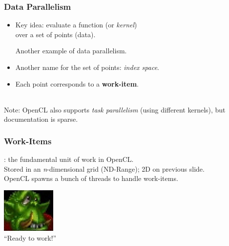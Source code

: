 \begin{frame}
  \frametitle{Data Parallelism}


  \begin{itemize}
    \item Key idea: evaluate a function (or {\it kernel}) \\
     \qquad over a set of points (data).\\

\begin{center}
\end{center}

      Another example of data parallelism.\\[1em]
    \item Another name for the set of points: {\it index space}.
    \item Each point corresponds to a {\bf work-item}.
  \end{itemize}~\\[1em]

  Note: OpenCL also supports {\it task parallelism} (using different kernels),
  but documentation is sparse.

\end{frame}

\begin{frame}
  \frametitle{Work-Items}


    : the fundamental unit of work in OpenCL.\\
    Stored in an {\it n}-dimensional grid (ND-Range); 2D on previous slide.\\[1em]

    OpenCL spawns a bunch of threads to handle work-items.
    
    \begin{center}
	\includegraphics[width=0.2\textwidth]{images/peon.jpeg}\\
	\hfill ``Ready to work!''
	\end{center}
    
\end{frame}
    
